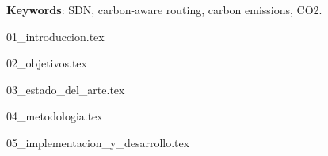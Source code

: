 \documentclass[minitoc, hidelinks, headlogo, framedcover]{tfeEPCC}
\begin{document}
\noindent\textbf{Keywords}: SDN, carbon-aware routing, carbon emissions, CO2.

\newpage
\pagestyle{plain}
\setcounter{page}{1}
\tableofcontents
\newpage
\listoftables
\newpage
\listoffigures
\newpage




\pagestyle{fancy}
\setcounter{page}{1}

{01_introduccion.tex}

{02_objetivos.tex}

{03_estado_del_arte.tex}

{04_metodologia.tex}

{05_implementacion_y_desarrollo.tex}
\end{document}

